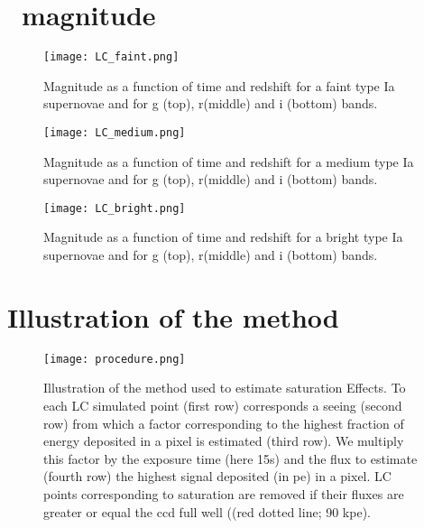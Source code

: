 \begin{appendices}
    
\section{\sne~magnitude}

\begin{figure}[htbp]
\begin{center}
  \texttt{[image: LC\_faint.png]}
 \caption{Magnitude as a function of time and redshift for a faint type Ia supernovae and for g (top), r(middle) and i (bottom) bands.}\label{fig:lcfaint}
\end{center}
\end{figure}

\begin{figure}[htbp]
\begin{center}
  \texttt{[image: LC\_medium.png]}
 \caption{Magnitude as a function of time and redshift for a medium type Ia supernovae and for g (top), r(middle) and i (bottom) bands.}\label{fig:lcmedium}
\end{center}
\end{figure}

\begin{figure}[htbp]
\begin{center}
  \texttt{[image: LC\_bright.png]}
 \caption{Magnitude as a function of time and redshift for a bright type Ia supernovae and for g (top), r(middle) and i (bottom) bands.}\label{fig:lcbright}
\end{center}
\end{figure}

\section{Illustration of the method}
\begin{figure}[htbp]
\begin{center}
  \texttt{[image: procedure.png]}
 \caption{Illustration of the method used to estimate saturation Effects. To each LC simulated point (first row) corresponds a seeing (second row) from which a factor corresponding to the highest fraction of energy deposited in a pixel is estimated (third row). We multiply this factor by the exposure time (here 15s) and the flux to estimate (fourth row) the highest signal deposited (in pe) in a pixel.  LC points corresponding to saturation are removed if their fluxes are greater or equal the ccd full well ((red dotted line; 90 kpe).}\label{fig:method}
\end{center}
\end{figure}


\end{appendices}
